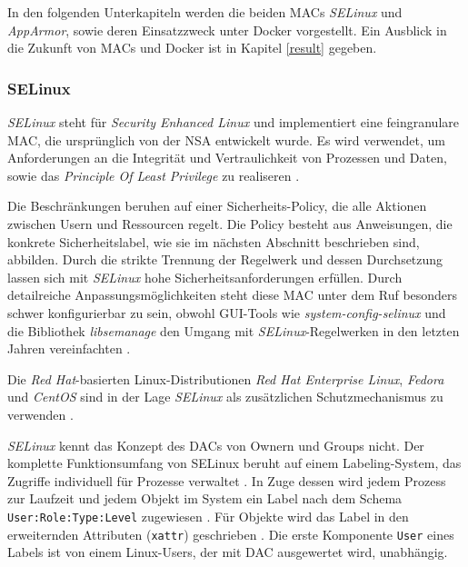 \documentclass[../main.tex]{subfiles}
\begin{document}

			In den folgenden Unterkapiteln werden die beiden MACs \emph{SELinux} und \emph{AppArmor}, sowie deren Einsatzzweck unter Docker vorgestellt. Ein Ausblick in die Zukunft von MACs und Docker ist in Kapitel \ref{result} gegeben.

  		\subsubsection{\acrshort{SELinux}}
				\emph{SELinux} steht für \emph{Security Enhanced Linux} und implementiert eine feingranulare MAC, die ursprünglich von der NSA entwickelt wurde. Es wird verwendet, um Anforderungen an die Integrität und Vertraulichkeit von Prozessen und Daten, sowie das \emph{Principle Of Least Privilege} zu realiseren \cite{redhatSec}. %


				Die Beschränkungen beruhen auf einer Sicherheits-Policy, die alle Aktionen zwischen Usern und Ressourcen regelt. Die Policy besteht aus Anweisungen, die konkrete Sicherheitslabel, wie sie im nächsten Abschnitt beschrieben sind, abbilden. Durch die strikte Trennung der Regelwerk und dessen Durchsetzung lassen sich mit \emph{SELinux} hohe Sicherheitsanforderungen erfüllen. Durch detailreiche Anpassungsmöglichkeiten steht diese MAC unter dem Ruf besonders schwer konfigurierbar zu sein, obwohl GUI-Tools wie \emph{system-config-selinux} und die Bibliothek \emph{libsemanage} den Umgang mit \emph{SELinux}-Regelwerken in den letzten Jahren vereinfachten \cite[S.62,S.67]{linuxMagazineSec}.

				Die \emph{Red Hat}-basierten Linux-Distributionen \emph{Red Hat Enterprise Linux}, \emph{Fedora} und \emph{CentOS} sind in der Lage \emph{SELinux} als zusätzlichen Schutzmechanismus zu verwenden \cite{dockerSecurity}.

				\emph{SELinux} kennt das Konzept des DACs von Ownern und Groups nicht. Der komplette Funktionsumfang von SELinux beruht auf einem Labeling-System, das Zugriffe individuell für Prozesse verwaltet \cite{SELinuxComic}. In Zuge dessen wird jedem Prozess zur Laufzeit und jedem Objekt im System ein Label nach dem Schema \texttt{User:Role:Type:Level} zugewiesen \cite{atomicDockerSELinux}. Für Objekte wird das Label in den erweiternden Attributen (\texttt{xattr}) geschrieben \cite[S.65]{linuxMagazineSec}. Die erste Komponente \texttt{User} eines Labels ist von einem Linux-Users, der mit DAC ausgewertet wird, unabhängig.
\end{document}
